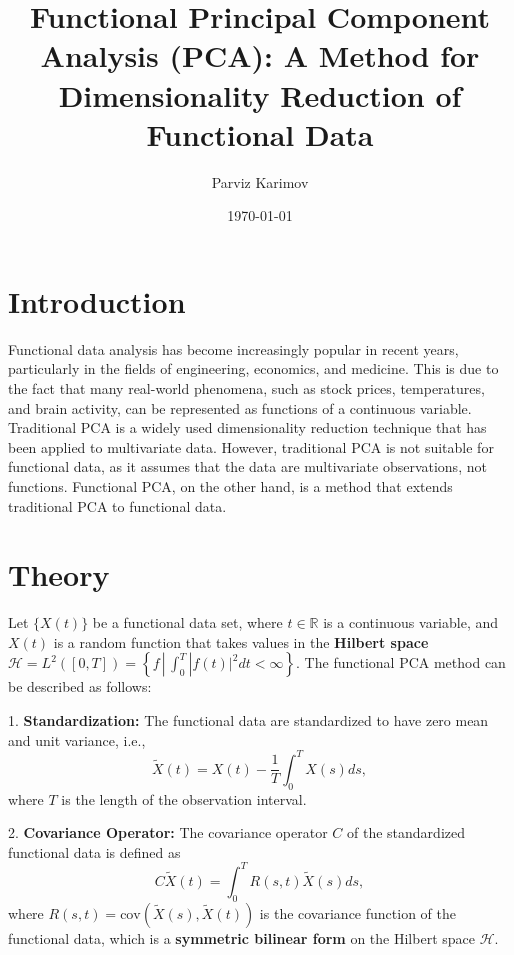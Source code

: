 \documentclass{article}
\title{Functional Principal Component Analysis (PCA): A Method for Dimensionality Reduction of Functional Data}
\author{Parviz Karimov}
\date{\today}
\begin{document}
\maketitle


\section{Introduction} Functional data analysis has become increasingly popular in recent years, particularly in the fields of engineering, economics, and medicine. This is due to the fact that many real-world phenomena, such as stock prices, temperatures, and brain activity, can be represented as functions of a continuous variable. Traditional PCA is a widely used dimensionality reduction technique that has been applied to multivariate data. However, traditional PCA is not suitable for functional data, as it assumes that the data are multivariate observations, not functions. Functional PCA, on the other hand, is a method that extends traditional PCA to functional data. \section{Theory} Let $\{X(t)\}$ be a functional data set, where $t \in \mathbb{R}$ is a continuous variable, and $X(t)$ is a random function that takes values in the \textbf{Hilbert space} $\mathcal{H} = L^2([0, T]) = \left\{ f \,|\, \int_{0}^{T} |f(t)|^2 dt < \infty \right\}$. The functional PCA method can be described as follows:

1. \textbf{Standardization:} The functional data are standardized to have zero mean and unit variance, i.e., \[ \tilde{X}(t) = X(t) - \frac{1}{T} \int_{0}^{T} X(s)ds, \] where $T$ is the length of the observation interval.

2. \textbf{Covariance Operator:} The covariance operator $C$ of the standardized functional data is defined as \[ C \tilde{X}(t) = \int_{0}^{T} R(s, t) \tilde{X}(s) ds, \] where $R(s,t) = \text{cov}(\tilde{X}(s), \tilde{X}(t))$ is the covariance function of the functional data, which is a \textbf{symmetric bilinear form} on the Hilbert space $\mathcal{H}$.
\end{document}
